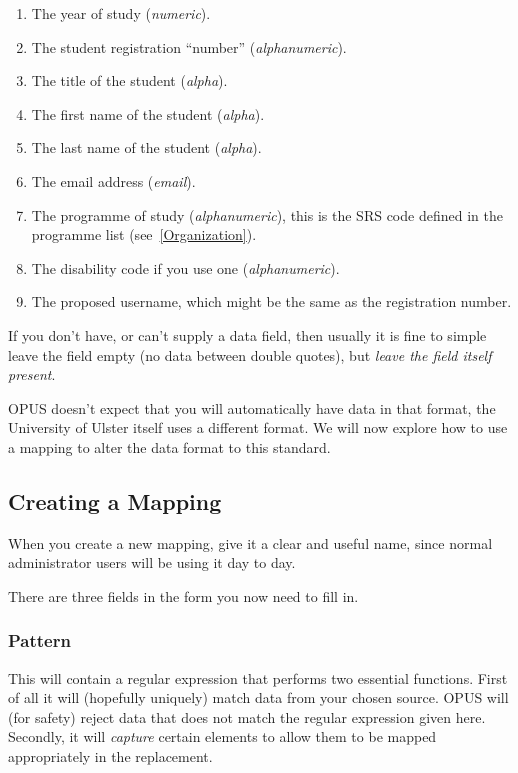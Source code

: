 \documentclass[12 pt]{book}
\begin{document}
\begin{enumerate}
  \item The year of study (\emph{numeric}).
  \item The student registration ``number'' (\emph{alphanumeric}).
  \item The title of the student (\emph{alpha}).
  \item The first name of the student (\emph{alpha}).
  \item The last name of the student (\emph{alpha}).
  \item The email address (\emph{email}).
  \item The programme of study (\emph{alphanumeric}), this is the SRS code defined in the programme list (see~\ref{Organization}).
  \item The disability code if you use one (\emph{alphanumeric}).
  \item The proposed username, which might be the same as the registration number.
\end{enumerate}

If you don't have, or can't supply a data field, then usually it is fine to
simple leave the field empty (no data between double quotes), but \emph{leave
the field itself present}.

OPUS doesn't expect that you will automatically have data in that format, the
University of Ulster itself uses a different format. We will now explore how
to use a mapping to alter the data format to this standard.

\subsection{Creating a Mapping}

When you create a new mapping, give it a clear and useful name, since normal
administrator users will be using it day to day.


There are three fields in the form you now need to fill in.

\subsubsection{Pattern}

This will contain a regular expression that performs two essential functions.
First of all it will (hopefully uniquely) match data from your chosen source.
OPUS will (for safety) reject data that does not match the regular expression
given here. Secondly, it will \emph{capture} certain elements to allow them to
be mapped appropriately in the replacement.
\end{document}
